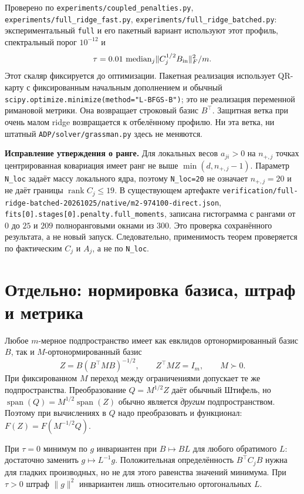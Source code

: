 \documentclass[11pt,a4paper]{article}
\newcommand{\spn}{\operatorname{span}}
\newcommand{\rank}{\operatorname{rank}}
\newcommand{\norm}[1]{\lVert#1\rVert}
\newcommand{\code}[1]{\nolinkurl{#1}}
\theoremstyle{remark}
\begin{document}
Проверено по \code{experiments/coupled_penalties.py},
\code{experiments/full_ridge_fast.py},
\code{experiments/full_ridge_batched.py}: экспериментальный
\code{full} и его пакетный вариант используют этот профиль, спектральный
порог $10^{-12}$ и
\[
 \tau=0.01\,\operatorname{median}_j
 \norm{C_j^{1/2}B_{\rm in}}_F^2/m.
\]
Этот скаляр фиксируется до оптимизации. Пакетная реализация использует
QR-карту с фиксированным начальным дополнением и обычный
\code{scipy.optimize.minimize(method="L-BFGS-B")}; это не реализация
переменной римановой метрики. Она возвращает строковый базис $B^\top$.
Защитная ветка при очень малом ridge возвращается к отбелённому профилю.
Ни эта ветка, ни штатный \code{ADP/solver/grassman.py} здесь не меняются.

\textbf{Исправление утверждения о ранге.}
Для локальных весов $a_{ji}>0$ на $n_{+,j}$ точках центрированная ковариация
имеет ранг не выше $\min(d,n_{+,j}-1)$. Параметр \code{N_loc} задаёт массу
локального ядра, поэтому \code{N_loc=20} не означает $n_{+,j}=20$ и не
даёт границы $\rank C_j\le19$. В существующем артефакте
\code{verification/full-ridge-batched-20261025/native/m2-974100-direct.json},
\code{fits[0].stages[0].penalty.full_moments}, записана гистограмма
с рангами от $0$ до $25$ и $209$ полноранговыми окнами из $300$.
Это проверка сохранённого результата, а не новый запуск.
Следовательно, применимость теорем проверяется по фактическим $C_j$ и
$A_j$, а не по \code{N_loc}.

\section{Отдельно: нормировка базиса, штраф и метрика}

Любое $m$-мерное подпространство имеет как евклидов ортонормированный базис
$B$, так и $M$-ортонормированный базис
\begin{equation}\label{eq:same-subspace}
 Z=B(B^\top MB)^{-1/2},\qquad Z^\top MZ=I_m,
 \qquad M\succ0.
\end{equation}
При фиксированном $M$ переход между ограничениями допускает те же
подпространства. Преобразование $Q=M^{1/2}Z$ даёт обычный Штифель,
но $\spn(Q)=M^{1/2}\spn(Z)$ обычно является \emph{другим}
подпространством. Поэтому при вычислениях в $Q$ надо преобразовать и
функционал: $F(Z)=F(M^{-1/2}Q)$.

При $\tau=0$ минимум по $g$ инвариантен при $B\mapsto BL$ для любого
обратимого $L$: достаточно заменить $g\mapsto L^{-1}g$.
Положительная определённость $B^\top C_jB$ нужна для гладких производных,
но не для этого равенства значений минимума. При $\tau>0$
штраф $\norm{g}^2$ инвариантен лишь относительно ортогональных $L$.
\end{document}
